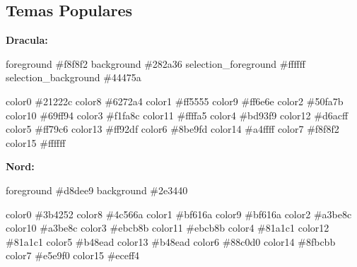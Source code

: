 \documentclass[
  doc,
  floatsintext,
  longtable,
  a4paper,
  nolmodern,
  notxfonts,
  notimes,
  12pt,
  colorlinks=true,linkcolor=blue,citecolor=blue,urlcolor=blue]{apa7}
\newenvironment{Shaded}{\begin{snugshade}}{\end{snugshade}}
\newcommand{\CommentTok}[1]{\textcolor[rgb]{0.37,0.37,0.37}{#1}}
\newcommand{\DataTypeTok}[1]{\textcolor[rgb]{0.68,0.00,0.00}{#1}}
\begin{document}
\subsection{Temas Populares}\label{temas-populares}

\textbf{Dracula:}

\begin{Shaded}
\begin{Highlighting}[]
\DataTypeTok{foreground} \CommentTok{\#f8f8f2}
\DataTypeTok{background} \CommentTok{\#282a36}
\DataTypeTok{selection\_foreground} \CommentTok{\#ffffff}
\DataTypeTok{selection\_background} \CommentTok{\#44475a}

\DataTypeTok{color0}  \CommentTok{\#21222c}
\DataTypeTok{color8}  \CommentTok{\#6272a4}
\DataTypeTok{color1}  \CommentTok{\#ff5555}
\DataTypeTok{color9}  \CommentTok{\#ff6e6e}
\DataTypeTok{color2}  \CommentTok{\#50fa7b}
\DataTypeTok{color10} \CommentTok{\#69ff94}
\DataTypeTok{color3}  \CommentTok{\#f1fa8c}
\DataTypeTok{color11} \CommentTok{\#ffffa5}
\DataTypeTok{color4}  \CommentTok{\#bd93f9}
\DataTypeTok{color12} \CommentTok{\#d6acff}
\DataTypeTok{color5}  \CommentTok{\#ff79c6}
\DataTypeTok{color13} \CommentTok{\#ff92df}
\DataTypeTok{color6}  \CommentTok{\#8be9fd}
\DataTypeTok{color14} \CommentTok{\#a4ffff}
\DataTypeTok{color7}  \CommentTok{\#f8f8f2}
\DataTypeTok{color15} \CommentTok{\#ffffff}
\end{Highlighting}
\end{Shaded}

\textbf{Nord:}

\begin{Shaded}
\begin{Highlighting}[]
\DataTypeTok{foreground} \CommentTok{\#d8dee9}
\DataTypeTok{background} \CommentTok{\#2e3440}

\DataTypeTok{color0}  \CommentTok{\#3b4252}
\DataTypeTok{color8}  \CommentTok{\#4c566a}
\DataTypeTok{color1}  \CommentTok{\#bf616a}
\DataTypeTok{color9}  \CommentTok{\#bf616a}
\DataTypeTok{color2}  \CommentTok{\#a3be8c}
\DataTypeTok{color10} \CommentTok{\#a3be8c}
\DataTypeTok{color3}  \CommentTok{\#ebcb8b}
\DataTypeTok{color11} \CommentTok{\#ebcb8b}
\DataTypeTok{color4}  \CommentTok{\#81a1c1}
\DataTypeTok{color12} \CommentTok{\#81a1c1}
\DataTypeTok{color5}  \CommentTok{\#b48ead}
\DataTypeTok{color13} \CommentTok{\#b48ead}
\DataTypeTok{color6}  \CommentTok{\#88c0d0}
\DataTypeTok{color14} \CommentTok{\#8fbcbb}
\DataTypeTok{color7}  \CommentTok{\#e5e9f0}
\DataTypeTok{color15} \CommentTok{\#eceff4}
\end{Highlighting}
\end{Shaded}
\end{document}
